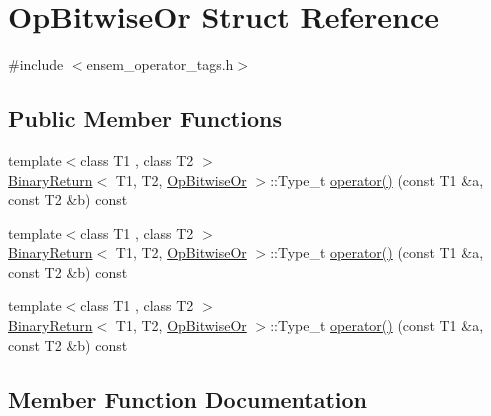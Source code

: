 \hypertarget{structOpBitwiseOr}{}\section{Op\+Bitwise\+Or Struct Reference}
\label{structOpBitwiseOr}


{\ttfamily \#include $<$ensem\+\_\+operator\+\_\+tags.\+h$>$}

\subsection*{Public Member Functions}
\begin{DoxyCompactItemize}
\item 
{\footnotesize template$<$class T1 , class T2 $>$ }\\\mbox{\hyperlink{structBinaryReturn}{Binary\+Return}}$<$ T1, T2, \mbox{\hyperlink{structOpBitwiseOr}{Op\+Bitwise\+Or}} $>$\+::Type\+\_\+t \mbox{\hyperlink{structOpBitwiseOr_a05a68ce8b7a79808447ed381afb810be}{operator()}} (const T1 \&a, const T2 \&b) const
\item 
{\footnotesize template$<$class T1 , class T2 $>$ }\\\mbox{\hyperlink{structBinaryReturn}{Binary\+Return}}$<$ T1, T2, \mbox{\hyperlink{structOpBitwiseOr}{Op\+Bitwise\+Or}} $>$\+::Type\+\_\+t \mbox{\hyperlink{structOpBitwiseOr_a05a68ce8b7a79808447ed381afb810be}{operator()}} (const T1 \&a, const T2 \&b) const
\item 
{\footnotesize template$<$class T1 , class T2 $>$ }\\\mbox{\hyperlink{structBinaryReturn}{Binary\+Return}}$<$ T1, T2, \mbox{\hyperlink{structOpBitwiseOr}{Op\+Bitwise\+Or}} $>$\+::Type\+\_\+t \mbox{\hyperlink{structOpBitwiseOr_a05a68ce8b7a79808447ed381afb810be}{operator()}} (const T1 \&a, const T2 \&b) const
\end{DoxyCompactItemize}


\subsection{Member Function Documentation}
\mbox{\label{structOpBitwiseOr_a05a68ce8b7a79808447ed381afb810be}} 
